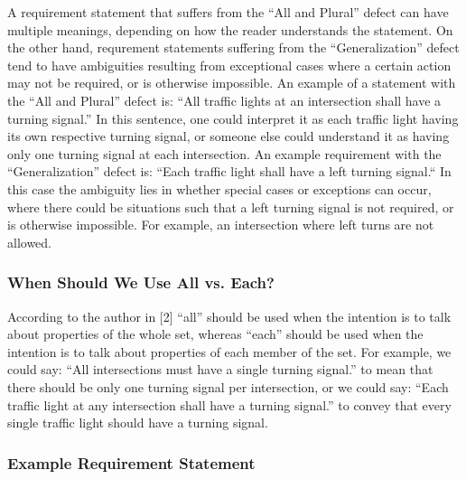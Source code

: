 \documentclass[letterpaper,12pt]{article}
\begin{document}
A requirement statement that suffers from the ``All and Plural'' defect can have
multiple meanings, depending on how the reader understands the statement. On the
other hand, requrement statements suffering from the ``Generalization'' defect
tend to have ambiguities resulting from exceptional cases where a certain action
may not be required, or is otherwise impossible. An example of a statement with
the ``All and Plural'' defect is: ``All traffic lights at an intersection shall
have a turning signal.'' In this sentence, one could interpret it as each
traffic light having its own respective turning signal, or someone else could
understand it as having only one turning signal at each intersection. An example
requirement with the ``Generalization'' defect is: ``Each traffic light shall
have a left turning signal.`` In this case the ambiguity lies in whether special
cases or exceptions can occur, where there could be situations such that a left
turning signal is not required, or is otherwise impossible. For example, an
intersection where left turns are not allowed.

\subsubsection{When Should We Use All vs. Each?}

According to the author in [2] ``all'' should be used when the intention is to
talk about properties of the whole set, whereas ``each'' should be used when the
intention is to talk about properties of each member of the set. For example, we
could say: ``All intersections must have a single turning signal.'' to mean that
there should be only one turning signal per intersection, or we could say:
``Each traffic light at any intersection shall have a turning signal.'' to
convey that every single traffic light should have a turning signal.

\subsubsection{Example Requirement Statement}
\end{document}
